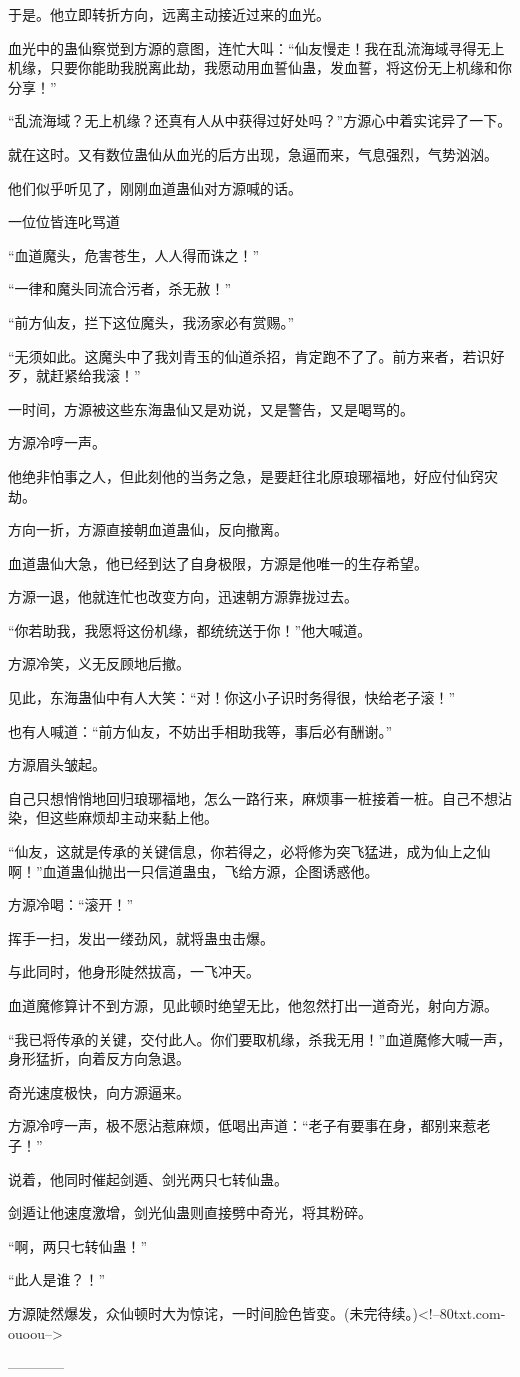 \begin{this_body}
于是。他立即转折方向，远离主动接近过来的血光。

血光中的蛊仙察觉到方源的意图，连忙大叫：“仙友慢走！我在乱流海域寻得无上机缘，只要你能助我脱离此劫，我愿动用血誓仙蛊，发血誓，将这份无上机缘和你分享！”

“乱流海域？无上机缘？还真有人从中获得过好处吗？”方源心中着实诧异了一下。

就在这时。又有数位蛊仙从血光的后方出现，急逼而来，气息强烈，气势汹汹。

他们似乎听见了，刚刚血道蛊仙对方源喊的话。

一位位皆连叱骂道

“血道魔头，危害苍生，人人得而诛之！”

“一律和魔头同流合污者，杀无赦！”

“前方仙友，拦下这位魔头，我汤家必有赏赐。”

“无须如此。这魔头中了我刘青玉的仙道杀招，肯定跑不了了。前方来者，若识好歹，就赶紧给我滚！”

一时间，方源被这些东海蛊仙又是劝说，又是警告，又是喝骂的。

方源冷哼一声。

他绝非怕事之人，但此刻他的当务之急，是要赶往北原琅琊福地，好应付仙窍灾劫。

方向一折，方源直接朝血道蛊仙，反向撤离。

血道蛊仙大急，他已经到达了自身极限，方源是他唯一的生存希望。

方源一退，他就连忙也改变方向，迅速朝方源靠拢过去。

“你若助我，我愿将这份机缘，都统统送于你！”他大喊道。

方源冷笑，义无反顾地后撤。

见此，东海蛊仙中有人大笑：“对！你这小子识时务得很，快给老子滚！”

也有人喊道：“前方仙友，不妨出手相助我等，事后必有酬谢。”

方源眉头皱起。

自己只想悄悄地回归琅琊福地，怎么一路行来，麻烦事一桩接着一桩。自己不想沾染，但这些麻烦却主动来黏上他。

“仙友，这就是传承的关键信息，你若得之，必将修为突飞猛进，成为仙上之仙啊！”血道蛊仙抛出一只信道蛊虫，飞给方源，企图诱惑他。

方源冷喝：“滚开！”

挥手一扫，发出一缕劲风，就将蛊虫击爆。

与此同时，他身形陡然拔高，一飞冲天。

血道魔修算计不到方源，见此顿时绝望无比，他忽然打出一道奇光，射向方源。

“我已将传承的关键，交付此人。你们要取机缘，杀我无用！”血道魔修大喊一声，身形猛折，向着反方向急退。

奇光速度极快，向方源逼来。

方源冷哼一声，极不愿沾惹麻烦，低喝出声道：“老子有要事在身，都别来惹老子！”

说着，他同时催起剑遁、剑光两只七转仙蛊。

剑遁让他速度激增，剑光仙蛊则直接劈中奇光，将其粉碎。

“啊，两只七转仙蛊！”

“此人是谁？！”

方源陡然爆发，众仙顿时大为惊诧，一时间脸色皆变。(未完待续。)<!--80txt.com-ouoou-->

------------

\end{this_body}

